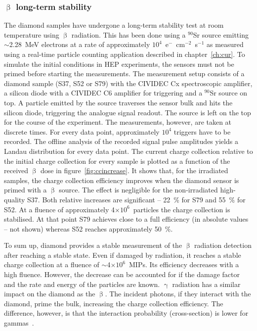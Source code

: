 \subsubsection{$\upbeta$ long-term stability}
The diamond samples have undergone a long-term stability test at room temperature using $\upbeta$ radiation. This has been done using a $^{90}$Sr source emitting $\sim$2.28~MeV electrons at a rate of approximately $10^4$~e$^-$~cm$^{-2}$~s$^{-1}$ as measured using a real-time particle counting application described in chapter~\ref{ch:cur}. To simulate the initial conditions in HEP experiments, the sensors must not be primed before starting the measurements. The measurement setup consists of a diamond sample (S37, S52 or S79) with the CIVIDEC Cx spectroscopic amplifier, a silicon diode with a CIVIDEC C6 amplifier for triggering and a $^{90}$Sr source on top. A particle emitted by the source traverses the sensor bulk and hits the silicon diode, triggering the analogue signal readout. The source is left on the top for the course of the experiment. The measurements, however, are taken at discrete times. For every data point, approximately $10^4$ triggers have to be recorded. The offline analysis of the recorded signal pulse amplitudes yields a Landau distribution for every data point. The current charge collection relative to the initial charge collection for every sample is plotted as a function of the received $\upbeta$ dose in figure~\ref{fig:ccincrease}. It shows that, for the irradiated samples, the charge collection efficiency improves when the diamond sensor is primed with a $\upbeta$ source. The effect is negligible for the non-irradiated high-quality S37. Both relative increases are significant -- 22~\% for S79 and 55~\% for S52. At a fluence of approximately 4$\times10^6$~particles the charge collection is stabilised. At that point S79 achieves close to a full efficiency (in absolute values -- not shown) whereas S52 reaches approximately 50~\%.


To sum up, diamond provides a stable measurement of the $\upbeta$ radiation detection after reaching a stable state. Even if damaged by radiation, it reaches a stable charge collection at a fluence of $\sim$4$\times10^6$~MIPs. Its efficiency decreases with a high fluence. %
However, the decrease can be accounted for if the damage factor and the rate and energy of the particles are known. $\upgamma$ radiation has a similar impact on the diamond as the $\upbeta$. The incident photons, if they interact with the diamond, prime the bulk, increasing the charge collection efficiency. The difference, however, is that the interaction probability (cross-section) is lower for gammas~\cite{sarin2014comprehensive,Griesmayer20121997}.

